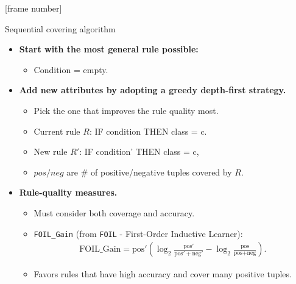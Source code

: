 \documentclass[aspectratio=169,t,table]{beamer}
\begin{document}
  {
    [frame number]
    \begin{frame}{Sequential covering algorithm}
      \begin{itemize}
        \item \textbf{Start with the most general rule possible:}
        \begin{itemize}
          \item Condition = empty.
        \end{itemize}
        \item \textbf{Add new attributes by adopting a greedy depth-first strategy.}
        \begin{itemize}
          \item Pick the one that improves the rule quality most.
          \item Current rule $R$: IF condition THEN class = c.
          \item New rule $R'$: IF condition' THEN class = c,
          \item $pos/neg$ are $\#$ of positive/negative tuples covered by $R$.
        \end{itemize}
        \item \textbf{Rule-quality measures.}
        \begin{itemize}
          \item Must consider both coverage and accuracy.
          \item \texttt{FOIL\_Gain} (from \texttt{FOIL} - First-Order Inductive Learner):
          \begin{align}
            \text{FOIL\_Gain} = \text{pos}' \left( \log_2 \frac{\text{pos}'}{\text{pos}' + \text{neg}'} - \log_2 \frac{\text{pos}}{\text{pos}+\text{neg}} \right).
          \end{align}
          \item Favors rules that have high accuracy and cover many positive tuples.
        \end{itemize}
      \end{itemize}
    \end{frame}
  }
\end{document}
